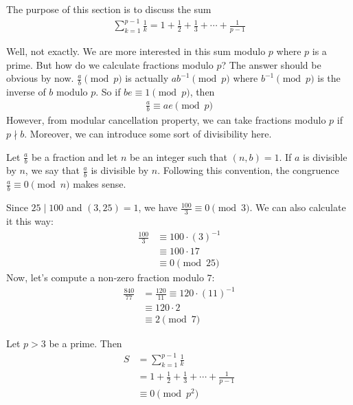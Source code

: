 \documentclass[12pt]{subfile}
\begin{document}
	The purpose of this section is to discuss the sum
		\begin{align*}
			\sum_{k=1}^{p-1} \frac{1}{k} = 1+\frac{1}{2}+ \frac{1}{3}+\cdots+ \frac{1}{p-1}
		\end{align*}

	Well, not exactly. We are more interested in this sum modulo $p$ where $p$ is a prime. But how do we calculate fractions modulo $p$? The answer should be obvious by now. $\frac{a}{b}\pmod p$ is actually $ab^{-1}\pmod p$ where $b^{-1}\pmod p$ is the inverse of $b$ modulo $p$. So if $be\equiv1\pmod p$, then
		\begin{align*}
			\frac{a}{b}\equiv ae\pmod p
		\end{align*}
	However, from modular cancellation property, we can take fractions modulo $p$ if $p\nmid b$. Moreover, we can introduce some sort of divisibility here.

	Let $ \frac{a}{b}$ be a fraction and let $n$ be an integer such that $(n,b)=1$. If $a$ is divisible by $n$, we say that $ \frac{a}{b}$ is divisible by $n$. Following this convention, the congruence $\frac{a}{b} \equiv 0 \pmod n$ makes sense.
		\begin{example}
			Since $25 \mid 100$ and $(3,25)=1$, we have $\frac{100}{3} \equiv 0 \pmod 3$. We can also calculate it this way:
				\begin{align*}
					\frac{100}{3}   &\equiv 100 \cdot (3)^{-1} \\
					&\equiv 100 \cdot 17\\
					&\equiv 0 \pmod{25}
				\end{align*}
			Now, let's compute a non-zero fraction modulo $7$:
				\begin{align*}
					\frac{840}{77} &= \frac{120}{11} \equiv 120 \cdot (11)^{-1}\\
					&\equiv 120 \cdot 2 \\
					& \equiv 2 \pmod{7}
				\end{align*}
		\end{example}


		\begin{theorem}\label{thm:wolst}
			Let $p>3$ be a prime. Then
			\begin{align*}
				S
					& = \sum_{k=1}^{p-1} \frac{1}{k}\\
					& = 1+\frac{1}{2}+ \frac{1}{3}+\cdots+ \frac{1}{p-1}\\
					& \equiv 0 \pmod{p^2}
			\end{align*}
		\end{theorem}
\end{document}
